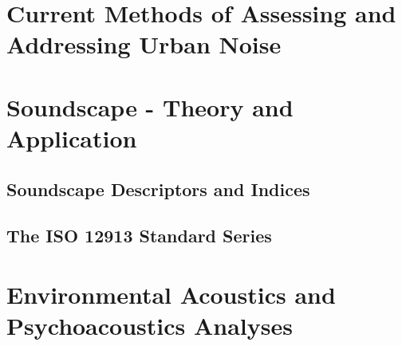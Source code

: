 \documentclass[twoside,fontsize=12pt,titlepage]{scrbook}
\begin{document}
 \section{Current Methods of Assessing and Addressing Urban Noise}
 \section{Soundscape - Theory and Application}
  \subsection{Soundscape Descriptors and Indices}
       \citep{Aletta2016Soundscape}
  
  \subsection{The ISO 12913 Standard Series}
 \section{Environmental Acoustics and Psychoacoustics Analyses}
  
  
  
  
  
  
  
  \backmatter
  
  
  
\end{document}
